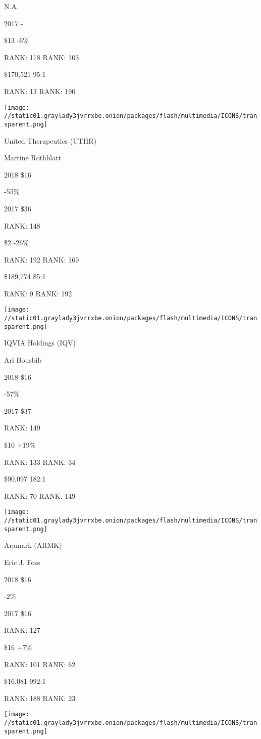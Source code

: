  N.A.

2017 -

 \$13 -6\%

RANK: 118 RANK: 103

 \$170,521 95:1

RANK: 13 RANK: 190

\texttt{[image: //static01.graylady3jvrrxbe.onion/packages/flash/multimedia/ICONS/transparent.png]}

United Therapeutics (UTHR)

Martine Rothblatt \protect\hyperlink{g-footnotes}{}

2018 \$16

 -55\%

2017 \$36

RANK: 148

 \$2 -26\%

RANK: 192 RANK: 169

 \$189,774 85:1

RANK: 9 RANK: 192

\texttt{[image: //static01.graylady3jvrrxbe.onion/packages/flash/multimedia/ICONS/transparent.png]}

IQVIA Holdings (IQV)

Ari Bousbib \protect\hyperlink{g-footnotes}{}

2018 \$16

 -57\%

2017 \$37

RANK: 149

 \$10 +19\%

RANK: 133 RANK: 34

 \$90,097 182:1

RANK: 70 RANK: 149

\texttt{[image: //static01.graylady3jvrrxbe.onion/packages/flash/multimedia/ICONS/transparent.png]}

Aramark (ARMK)

Eric J. Foss \protect\hyperlink{g-footnotes}{}

2018 \$16

 -2\%

2017 \$16

RANK: 127

 \$16 +7\%

RANK: 101 RANK: 62

 \$16,081 992:1

RANK: 188 RANK: 23

\texttt{[image: //static01.graylady3jvrrxbe.onion/packages/flash/multimedia/ICONS/transparent.png]}

